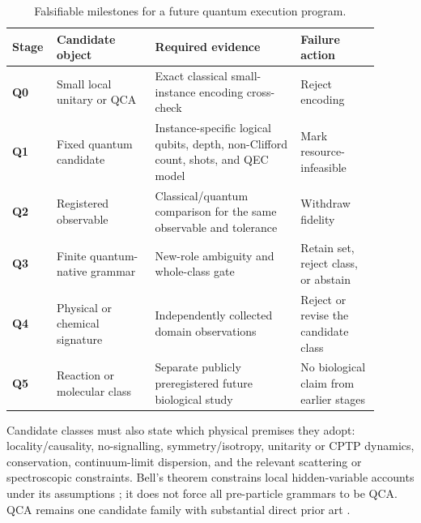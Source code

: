\begin{table}[htbp]
\centering
\small
\caption{Falsifiable milestones for a future quantum execution program.}\label{tab:q-milestones}
\begin{tabularx}{\linewidth}{>{\bfseries}p{0.08\linewidth}p{0.25\linewidth}p{0.37\linewidth}p{0.20\linewidth}}
\toprule
Stage & Candidate object & Required evidence & Failure action \\
\midrule
Q0 & Small local unitary or QCA & Exact classical small-instance encoding cross-check &
Reject encoding \\
Q1 & Fixed quantum candidate & Instance-specific logical qubits, depth, non-Clifford count,
shots, and QEC model & Mark resource-infeasible \\
Q2 & Registered observable & Classical/quantum comparison for the same observable and tolerance &
Withdraw fidelity \\
Q3 & Finite quantum-native grammar & New-role ambiguity and whole-class gate &
Retain set, reject class, or abstain \\
Q4 & Physical or chemical signature & Independently collected domain observations &
Reject or revise the candidate class \\
Q5 & Reaction or molecular class & Separate publicly preregistered future biological study &
No biological claim from earlier stages \\
\bottomrule
\end{tabularx}
\end{table}

Candidate classes must also state which physical premises they adopt: locality/causality,
no-signalling, symmetry/isotropy, unitarity or CPTP dynamics, conservation, continuum-limit
dispersion, and the relevant scattering or spectroscopic constraints. Bell's theorem constrains
local hidden-variable accounts under its assumptions \citep{bell1964}; it does not force all
pre-particle grammars to be QCA. QCA remains one candidate family with substantial direct prior
art \citep{watrous1995qca,meyer1996qca,bialynicki1994,schumacher2004,
arrighi2011localizability,gross2012qcaindex,darianoperinotti2014,
darianoperinotti2017,farrelly2020}.

